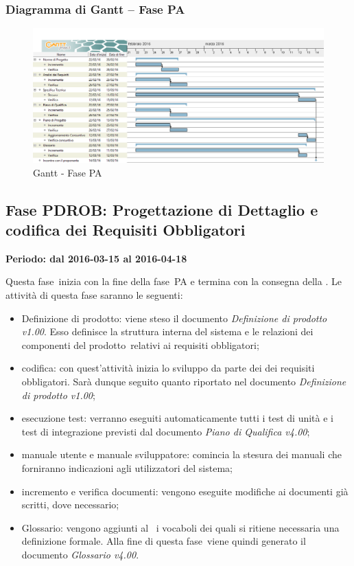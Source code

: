 \documentclass[../PianoProgetto.tex]{subfiles}
\begin{document}
		\subsubsection{Diagramma di Gantt – Fase PA}
			\begin{figure}[!h]
				\centering
				\includegraphics[width=\textwidth]{gantt_png/3-progettazione_architetturale}
				\caption{Gantt - Fase PA}
				\label{fig:Gantt - Fase PA}
			\end{figure}
			
	\subsection{Fase PDROB: Progettazione di Dettaglio e codifica dei Requisiti Obbligatori}
		\textbf{Periodo: dal 2016-03-15 al 2016-04-18}
		
		Questa fase\g\ inizia con la fine della fase\g\ PA e termina con la consegna della \revisionediprogettazione . Le attività di questa fase saranno le seguenti:
		\begin{itemize}
			\item Definizione di prodotto: viene steso il documento \textit{Definizione di prodotto v1.00}. Esso definisce la struttura interna del sistema e le relazioni dei componenti del prodotto\g\ relativi ai requisiti obbligatori;

			\item codifica: con quest'attività inizia lo sviluppo da parte dei \programmatori dei requisiti obbligatori. Sarà dunque seguito quanto riportato nel documento \textit{Definizione di prodotto v1.00};

			\item esecuzione test: verranno eseguiti automaticamente tutti i test di unità e i test di integrazione previsti dal documento \textit{Piano di Qualifica v4.00};

			\item manuale utente e manuale sviluppatore: comincia la stesura dei manuali che forniranno indicazioni agli utilizzatori del sistema;

			\item incremento e verifica documenti: vengono eseguite modifiche ai documenti già scritti, dove necessario;

			\item Glossario: vengono aggiunti al \glossario\ i vocaboli dei quali si ritiene necessaria una definizione formale. Alla fine di questa fase\g\ viene quindi generato il documento \textit{Glossario v4.00}.
		\end{itemize}
\end{document}
